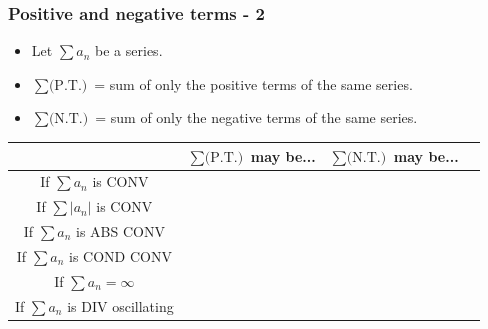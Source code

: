 \begin{frame}[t]
	\fontsize{11}{11}\selectfont
	\frametitle{Positive and negative terms - 2}

	\begin{itemize}
		\item Let $\displaystyle \sum a_{n}$ be a series.

		\item $\displaystyle \sum \text{(P.T.)}$ \; = \; sum of only the positive terms
			of the same series.

		\item $\displaystyle \sum \text{(N.T.)}$ \; = \; sum of only the negative terms
			of the same series.
	\end{itemize}
	\begin{center}
		\begin{tabular}{c|c|c|c|}
			                                                 & $\displaystyle \sum \text{(P.T.)}$ may be... & $\displaystyle \sum \text{(N.T.)}$ may be... \\
			\hline
			If $\displaystyle \sum a_{n}$ is CONV            &                                              & \phantom{$\displaystyle \frac{1}{1}$}        \\
			\hline
			If $\displaystyle \sum |a_{n}|$ is CONV          &                                              & \phantom{$\displaystyle \frac{1}{1}$}        \\
			\hline
			If $\displaystyle \sum a_{n}$ is ABS CONV        &                                              & \phantom{$\displaystyle \frac{1}{1}$}        \\
			\hline
			If $\displaystyle \sum a_{n}$ is COND CONV       &                                              & \phantom{$\displaystyle \frac{1}{1}$}        \\
			\hline
			If $\displaystyle \sum a_{n}= \infty$            &                                              & \phantom{$\displaystyle \frac{1}{1}$}        \\
			\hline
			If $\displaystyle \sum a_{n}$ is DIV oscillating &                                              & \phantom{$\displaystyle \frac{1}{1}$}        \\
			\hline
		\end{tabular}
	\end{center}
\end{frame}

